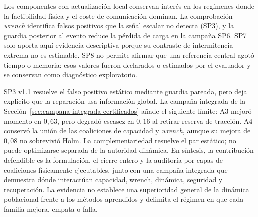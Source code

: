 Los componentes con actualización local conservan interés en los regímenes donde la factibilidad física y el coste de comunicación dominan. La comprobación \emph{wrench} identifica falsos positivos que la señal escalar no detecta (SP3), y la guardia posterior al evento reduce la pérdida de carga en la campaña SP6. SP7 solo aporta aquí evidencia descriptiva porque su contraste de intermitencia extrema no es estimable. SP8 no permite afirmar que una referencia central agotó tiempo o memoria: esos valores fueron declarados o estimados por el evaluador y se conservan como diagnóstico exploratorio.

SP3 v1.1 resuelve el falso positivo estático mediante guardia pareada, pero deja explícito que la reparación usa información global. La campaña integrada de la Sección~\ref{sec:campana-integrada-certificados} añade el siguiente límite: A3 mejoró momento en $0{,}63$, pero degradó escasez en $0{,}16$ al retirar reserva de tracción. A4 conservó la unión de las coaliciones de capacidad y \emph{wrench}, aunque su mejora de $0{,}08$ no sobrevivió Holm. La complementariedad resuelve el par estático; no puede optimizarse separada de la autoridad dinámica.
En síntesis, la contribución defendible es la formulación, el cierre entero y la auditoría por capas de coaliciones físicamente ejecutables, junto con una campaña integrada que demuestra dónde interactúan capacidad, wrench, dinámica, seguridad y recuperación. La evidencia no establece una superioridad general de la dinámica poblacional frente a los métodos aprendidos y delimita el régimen en que cada familia mejora, empata o falla.
